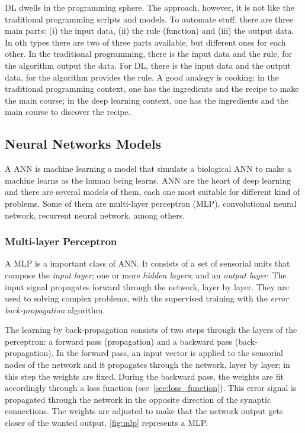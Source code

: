 DL dwells in the programming sphere. 
The approach, however, it is not like the traditional programming scripts and models. 
To automate stuff, there are three main parts: (i) the input data, (ii) the rule (function) and (iii) the output data. 
In oth types there are two of three parts available, but different ones for each other. 
In the traditional programming, there is the input data and the rule, for the algorithm output the data. 
For DL, there is the input data and the output data, for the algorithm provides the rule. 
A good analogy is cooking: in the traditional programming context, one has the ingredients and the recipe to make the main course; in the deep learning context, one has the ingredients and the main course to discover the recipe.

\subsection{Neural Networks Models}\label{sec:nn_models}

A ANN is machine learning a model that simulate a biological ANN to make a machine learns as the human being learns.
ANN are the heart of deep learning and there are several models of them, each one most suitable for different kind of problems.
Some of them are multi-layer perceptron (MLP), convolutional neural network, recurrent neural network, among others.

\subsubsection*{Multi-layer Perceptron}

A MLP is a important class of ANN. It consists of a set of sensorial units that compose the \emph{input layer}; one or more \emph{hidden layers}; and an \emph{output layer}. 
The input signal propagates forward through the network, layer by layer. 
They are used to solving complex problems, with the supervised training with the \emph{error back-propagation} algorithm.

The learning by back-propagation consists of two steps through the layers of the perceptron: a forward pass (propagation) and a backward pass (back-propagation). 
In the forward pass, an input vector is applied to the sensorial nodes of the network and it propagates through the network, layer by layer; in this step the weights are fixed. 
During the backward pass, the weights are fit accordingly through a loss function (see~\cref{sec:loss_function}). 
This error signal is propagated through the network in the opposite direction of the synaptic connections. 
The weights are adjusted to make that the network output gets closer of the wanted output. 
\cref{fig:mlp} represents a MLP.

